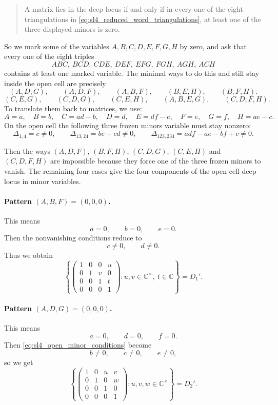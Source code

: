 \documentclass[12pt]{amsart}
\newcommand{\C}{\mathbb C}
\theoremstyle{plain}
\theoremstyle{definition}
\theoremstyle{remark}
\begin{document}
\begin{quote}
A matrix lies in the deep locus if and only if in every one of the eight triangulations in \eqref{eq:sl4_reduced_word_triangulations}, at least one of the three displayed minors is zero.
\end{quote}

So we mark some of the variables $A,B,C,D,E,F,G,H$ by zero, and ask that every one of the eight triples
\[
ABC,\ BCD,\ CDE,\ DEF,\ EFG,\ FGH,\ AGH,\ ACH
\]
contains at least one marked variable.  The minimal ways to do this and still stay inside the open cell are precisely
\begin{equation*}
(A,D,G),\qquad (A,D,F),\qquad (A,B,F),\qquad (B,E,H),\qquad (B,F,H).
\end{equation*}
\begin{equation*}
(C,E,G),\qquad (C,D,G),\qquad (C,E,H),\qquad (A,B,E,G),\qquad (C,D,F,H).
\end{equation*}
To translate them back to matrices, we use:
\[
A=a,\quad B=b,\quad C=ad-b,\quad D=d,\quad E=df-e,\quad F=e,\quad G=f,\quad H=ae-c.
\]
On the open cell the following three frozen minors variable must stay nonzero:
\begin{equation*}\label{eq:sl4_open_minor_conditions}
\Delta_{1,4}=c\neq0,
\qquad
\Delta_{13,24}=be-cd\neq0,
\qquad
\Delta_{123,234}=adf-ae-bf+c\neq0.
\end{equation*}

Then the ways $(A,D,F)$, $(B,F,H)$, $(C,D,G)$, $(C,E,H)$ and $(C,D,F,H)$ are impossible because they force one of the three frozen minors to vanish.  The remaining four cases give the four components of the open-cell deep locus in minor variables.
\bigskip

\paragraph{\bf Pattern $(A,B,F)=(0,0,0)$.}
This means
\[
a=0,\qquad b=0,\qquad e=0.
\]
Then the nonvanishing conditions reduce to
\[
c\neq0,\qquad d\neq0.
\]
Thus we obtain
\[
\left\{
\begin{pmatrix}
1&0&0&u\\
0&1&v&0\\
0&0&1&t\\
0&0&0&1
\end{pmatrix}
:u,v\in\C^{\times},\ t\in\C
\right\}=D_1'.
\]

\paragraph{\bf Pattern $(A,D,G)=(0,0,0)$.}
This means
\[
a=0,\qquad d=0,\qquad f=0.
\]
Then \eqref{eq:sl4_open_minor_conditions} become
\[
b\neq0,\qquad c\neq0,\qquad e\neq0,
\]
so we get
\[
\left\{
\begin{pmatrix}
1&0&u&v\\
0&1&0&w\\
0&0&1&0\\
0&0&0&1
\end{pmatrix}
:u,v,w\in\C^{\times}
\right\}=D_2'.
\]
\end{document}
